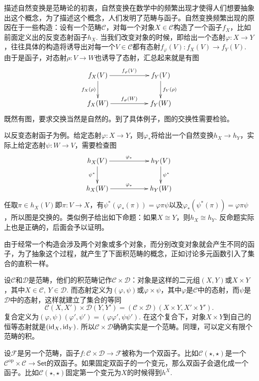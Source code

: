 描述自然变换是范畴论的初衷，自然变换在数学中的频繁出现才使得人们想要抽象出这个概念，为了描述这个概念，人们发明了范畴与函子。自然变换频繁出现的原因在于一些构造：设有一个范畴$\mathcal{C}$，对每一个对象$X\in \mathcal{C}$构造了一个函子$f_X$，比如前面定义出的反变态射函子$h_X$. 当我们改变对象的时候，即给出一个态射$\varphi:X\to Y$，往往具体的构造将诱导出对每一个$V\in \mathcal{C}$都有态射$f_\varphi(V):f_X(V)\to f_Y(V)$. 由于是函子，对态射$\rho:V\to W$也诱导了态射，汇总起来就是有图
\[
\begin{xy}
	\xymatrix{
		f_X(V)\ar[rr]^{f_\varphi(V)} \ar[d]_{f_X(\rho)}&&f_Y(V) \ar[d]^{f_Y(\rho)}\\
		f_X(W)\ar[rr]^{f_\varphi(W)}&&f_Y(W)
	}
\end{xy}
\]
既然有图，要求交换当然是自然的。到了具体例子，图的交换性需要检验。

以反变态射函子为例。给定态射$\varphi:X\to Y$，则$\varphi_*$将给出一个自然变换$h_X\to h_Y$，实际上给定态射$\psi:W\to V$，需要检查图
\[
\begin{xy}
	\xymatrix{
		h_X(V)\ar[rr]^{\varphi_*} \ar[d]_{\psi^*}&&h_Y(V) \ar[d]^{\psi^*}\\
		h_X(W)\ar[rr]^{\varphi_*}&&h_Y(W)
	}
\end{xy}
\]
任取$\pi\in h_X(V)$即$\pi:V\to X$，有$\psi^*(\varphi_*(\pi))=\varphi\pi\psi$以及$\varphi_*(\psi^*(\pi))=\varphi\pi\psi$，所以图是交换的。类似例子给出如下命题：如果$X\cong Y$，则$h_X\cong h_Y$. 反命题实际上也是正确的，后面会予以证明。

\para 由于经常一个构造会涉及两个对象或多个对象，而分别改变对象就会产生不同的函子，为了抽象这个过程，就产生了下面积范畴的概念，正如讨论多元函数引入了集合的直积一样。

设$\mathcal{C}$和$\mathcal{D}$是范畴，他们的积范畴记作$\mathcal{C}\times\mathcal{D}$：对象是这样的二元组$(X,Y)$或$X\times Y$，其中$X\in \mathcal{C}$, $Y\in\mathcal{D}$. 而态射定义为$(\varphi,\psi)$或$\varphi\times \psi$，其中$\varphi$是$\mathcal{C}$中的态射，而$\psi$是$\mathcal{D}$中的态射，这样就建立了集合的等同
\[
	{\mathcal{C}}(X,X')\times {\mathcal{D}}(Y,Y')=(\mathcal{C}\times \mathcal{D})(X\times Y,X'\times Y').
\]
复合定义为$(\varphi,\psi)(\varphi',\psi')=(\varphi\varphi',\psi\psi')$. 在这个复合下，对象$X\times Y$到自己的恒等态射就是$(\operatorname{id}_X,\operatorname{id}_Y)$. 所以$\mathcal{C}\times\mathcal{D}$确确实实是一个范畴。同理，可以定义有限个范畴的积。

设$\mathcal{F}$是另一个范畴，函子$f:\mathcal{C}\times \mathcal{D}\to \mathcal{F}$被称为一个双函子。比如$\mathcal{C}(\star,\star)$是一个$\mathcal{C}^\text{op}\times \mathcal{C}\to \mathsf{Set}$的双函子。如果固定双函子的一个变元，那么双函子会退化成一个函子。比如$\mathcal{C}(\star,\star)$固定第一个变元为$X$的时候得到$h^X$.

